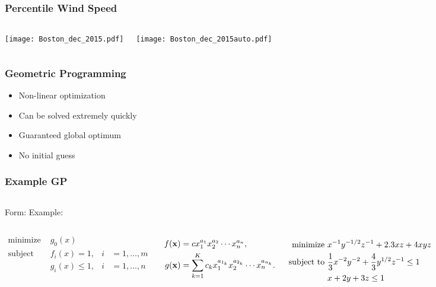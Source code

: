\documentclass{beamer}
\begin{document}
\begin{frame}
    \frametitle{Percentile Wind Speed}
    
    \begin{columns}
        \texttt{[image: Boston\_dec\_2015.pdf]}
        
        \texttt{[image: Boston\_dec\_2015auto.pdf]}
    \end{columns}
    
\end{frame}

\begin{frame}
    \frametitle{Geometric Programming}
    \begin{itemize}
        \item Non-linear optimization
        \item Can be solved extremely quickly
        \item Guaranteed global optimum
        \item No initial guess
        \end{itemize}
\end{frame}

\begin{frame}
    \frametitle{Example GP}

    \begin{columns}
        Form:
        Example:
    \end{columns}
    
    \begin{columns}
        \scriptsize
        \begin{align*}
            \text{minimize } &g_0(x) \\
            \text{subject to } &f_i(x) = 1, &i &= 1,\dots,m\\
                               &g_i(x) \leq 1, &i &= 1,\dots,n
        \end{align*}

        \begin{align*}
            f(\bold{x}) &= c x_1^{a_1} x_2^{a_2} \dotsm x_n^{a_n} , \\
            g(\bold{x}) &= \displaystyle\sum_{k=1}^K c_k x_1^{a_{1_k}} x_2^{a_{2_k}} \dotsm x_n^{a_{n_k}}.
        \end{align*}

        \scriptsize
        \begin{align*}
            \text{minimize } & x^{-1}y^{-1/2}z^{-1} + 2.3xz + 4xyz\\
            \text{subject to } &\frac{1}{3}x^{-2}y^{-2} + \frac{4}{3}y^{1/2}z^{-1} \leq 1\\
                              &x + 2y + 3z \leq 1
        \normalsize
        \end{align*}

    \end{columns}
\end{frame}
\end{document}
